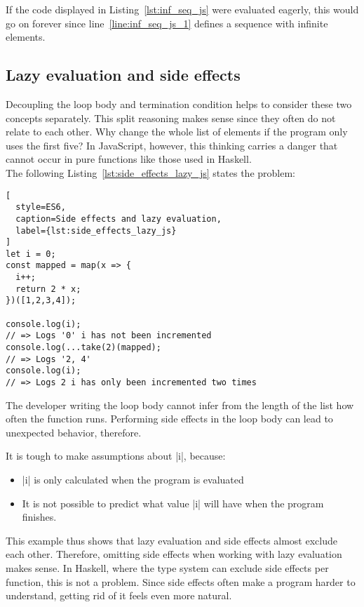 If the code displayed in Listing~\ref{lst:inf_seq_js} were evaluated eagerly,
this would go on forever since line~\ref{line:inf_seq_js_1} defines a sequence
with infinite elements. \\ 

\subsection{Lazy evaluation and side effects} %
\label{sub:Lazy evaluation and side effects}
Decoupling the loop body and termination condition helps to consider these two
concepts separately. This split reasoning makes sense since they often do not
relate to each other. Why change the whole list of elements if the program only
uses the first five? In JavaScript, however, this thinking carries a danger
that cannot occur in pure functions like those used in Haskell. \\ 
The following Listing~\ref{lst:side_effects_lazy_js} states the problem:

\begin{lstlisting}[
  style=ES6,
  caption=Side effects and lazy evaluation,
  label={lst:side_effects_lazy_js}
]
let i = 0;
const mapped = map(x => {
  i++;
  return 2 * x;
})([1,2,3,4]);

console.log(i);
// => Logs '0' i has not been incremented
console.log(...take(2)(mapped);
// => Logs '2, 4' 
console.log(i);
// => Logs 2 i has only been incremented two times
\end{lstlisting}

The developer writing the loop body cannot infer from the length of the list
how often the function runs. Performing side effects in the loop body can lead
to unexpected behavior, therefore. 

It is tough to make assumptions about |i|, because:
\begin{itemize}
  \item |i| is only calculated when the program is evaluated
  \item It is not possible to predict what value |i| will have when the program
    finishes.
\end{itemize}
This example thus shows that lazy evaluation and side effects almost exclude
each other. Therefore, omitting side effects when working with lazy evaluation
makes sense. In Haskell, where the type system can exclude side effects per
function, this is not a problem. Since side effects often make a program harder
to understand, getting rid of it feels even more natural.

